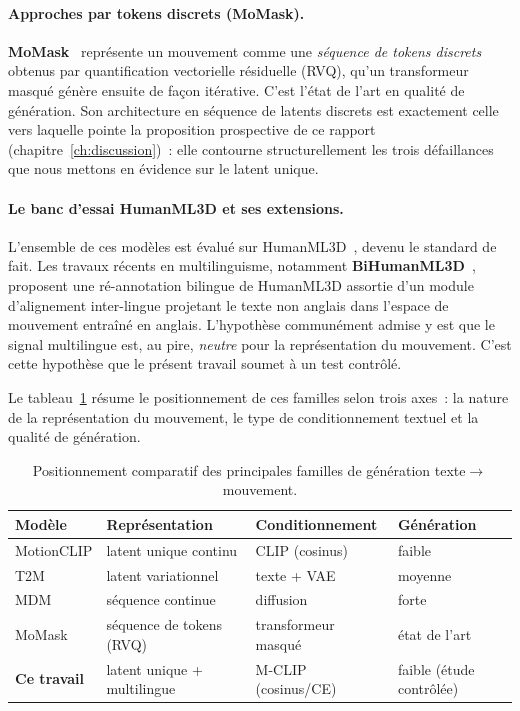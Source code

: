 \documentclass[12pt,a4paper,oneside]{report}
\theoremstyle{definition}
\theoremstyle{plain}
\begin{document}
\paragraph{Approches par tokens discrets (MoMask).}
\textbf{MoMask}~\cite{guo2024momask} représente un mouvement comme une
\emph{séquence de tokens discrets} obtenus par quantification vectorielle
résiduelle (RVQ), qu'un transformeur masqué génère ensuite de façon itérative.
C'est l'état de l'art en qualité de génération. Son architecture en séquence de
latents discrets est exactement celle vers laquelle pointe la proposition
prospective de ce rapport (chapitre~\ref{ch:discussion})~: elle contourne
structurellement les trois défaillances que nous mettons en évidence sur le latent
unique.

\paragraph{Le banc d'essai HumanML3D et ses extensions.}
L'ensemble de ces modèles est évalué sur HumanML3D~\cite{guo2022humanml3d}, devenu
le standard de fait. Les travaux récents en multilinguisme, notamment
\textbf{BiHumanML3D}~\cite{weng2026bihumanml3d}, proposent une ré-annotation
bilingue de HumanML3D assortie d'un module d'alignement inter-lingue projetant le
texte non anglais dans l'espace de mouvement entraîné en anglais. L'hypothèse
communément admise y est que le signal multilingue est, au pire, \emph{neutre} pour
la représentation du mouvement. C'est cette hypothèse que le présent travail
soumet à un test contrôlé.

Le tableau~\ref{tab:approches} résume le positionnement de ces familles selon trois
axes~: la nature de la représentation du mouvement, le type de conditionnement
textuel et la qualité de génération.

\begin{table}[ht]
\centering
\caption{Positionnement comparatif des principales familles de génération
texte$\rightarrow$mouvement.}
\label{tab:approches}
\small
\begin{tabular}{@{}lp{3.2cm}p{3.0cm}p{3.0cm}@{}}
\toprule
Modèle & Représentation & Conditionnement & Génération \\
\midrule
MotionCLIP & latent unique continu & CLIP (cosinus) & faible \\
T2M~\cite{guo2022humanml3d} & latent variationnel & texte + VAE & moyenne \\
MDM & séquence continue & diffusion & forte \\
MoMask & séquence de tokens (RVQ) & transformeur masqué & état de l'art \\
\textbf{Ce travail} & latent unique + multilingue & M-CLIP (cosinus/CE) & faible (étude contrôlée) \\
\bottomrule
\end{tabular}
\end{table}
\end{document}
